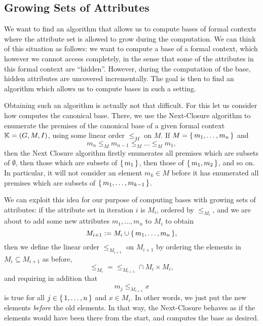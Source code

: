 \subsection{Growing Sets of Attributes}
\label{sec:grow-sets-attr}

We want to find an algorithm that allows us to compute bases of formal contexts where the
attribute set is allowed to grow during the computation.  We can think of this situation
as follows: we want to compute a base of a formal context, which however we cannot access
completely, in the sense that some of the attributes in this formal context are
\enquote{hidden}.  However, during the computation of the base, hidden attributes are
uncovered incrementally.  The goal is then to find an algorithm which allows us to compute
bases in such a setting.

Obtaining such an algorithm is actually not that difficult.  For this let us consider how
 computes the canonical base.  There, we use the Next-Closure
algorithm to enumerate the premises of the canonical base of a given formal context ${\mathbb{K}} = (G, M, I)$, using some linear order $\leq_{M}$ on $M$.  If $M = {\{\, m_{1}, \dots,
  m_{n} \,\}}$ and
\begin{equation*}
  m_{n} \leq_{M} m_{n-1} \leq_{M} \dots \leq_{M} m_{1},
\end{equation*}
then the Next Closure algorithm firstly enumerates all premises which are subsets of
$\emptyset$, then those which are subsets of ${\{\, m_{1} \,\}}$, then those of ${\{\, m_{1},
  m_{2} \,\}}$, and so on.  In particular, it will not consider an element $m_{k} \in M$
before it has enumerated all premises which are subsets of ${\{\, m_{1}, \dots, m_{k-1}
\,\}}$.

We can exploit this idea for our purpose of computing bases with growing sets of
attributes: if the attribute set in iteration $i$ is $M_{i}$, ordered by $\leq_{M_{i}}$,
and we are about to add some new attributes $m_{1}, \dots, m_{n}$ to $M_{i}$ to obtain
\begin{equation*}
  M_{i+1} := M_{i} \cup {\ensuremath{\{\, m_{1}, \dots, m_{n} \,\}}},
\end{equation*}
then we define the linear order $\leq_{M_{i+1}}$ on $M_{i+1}$ by ordering the elements in
$M_{i} \subseteq M_{i+1}$ as before, \ie
\begin{equation}
  \label{eq:48}
  \leq_{M_{i}} = {\leq_{M_{i+1}}} \cap M_{i} \times M_{i},
\end{equation}
and requiring in addition that
\begin{equation}
  \label{eq:49}
  m_{j} \leq_{M_{i+1}} x
\end{equation}
is true for all $j \in {\ensuremath{\{\, 1, \dots, n \,\}}}$ and $x \in M_{i}$.  In other words, we just
put the new elements \emph{before} the old elements.  In that way, the Next-Closure
behaves as if the elements would have been there from the start, and computes the base as
desired.

